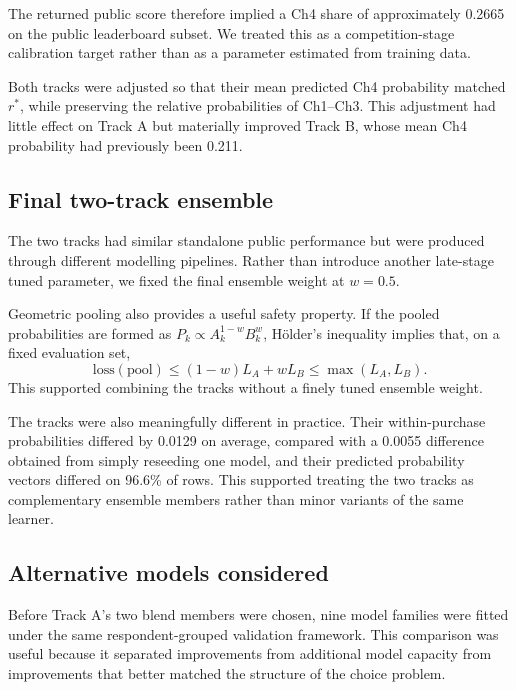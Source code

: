 \documentclass[11pt]{article}
\begin{document}
The returned public score therefore implied a Ch4 share of approximately 0.2665 on the
public leaderboard subset. We treated this as a competition-stage calibration target
rather than as a parameter estimated from training data.

Both tracks were adjusted so that their mean predicted Ch4 probability matched
$r^{*}$, while preserving the relative probabilities of Ch1--Ch3. This adjustment had
little effect on Track A but materially improved Track B, whose mean Ch4 probability had
previously been 0.211.

\subsection{Final two-track ensemble}\label{sub:pool}

The two tracks had similar standalone public performance but were produced through
different modelling pipelines. Rather than introduce another late-stage tuned parameter,
we fixed the final ensemble weight at $w=0.5$.

Geometric pooling also provides a useful safety property. If the pooled probabilities are
formed as $P_k \propto A_k^{1-w}B_k^w$, H\"older's inequality implies that, on a fixed
evaluation set,
\[
\mathrm{loss(pool)} \le (1-w)L_A+wL_B \le \max(L_A,L_B).
\]
This supported combining the tracks without a finely tuned ensemble weight.

The tracks were also meaningfully different in practice. Their within-purchase
probabilities differed by 0.0129 on average, compared with a 0.0055 difference obtained
from simply reseeding one model, and their predicted probability vectors differed on
96.6\% of rows. This supported treating the two tracks as complementary ensemble members
rather than minor variants of the same learner.

\subsection{Alternative models considered}\label{sub:field}

Before Track A's two blend members were chosen, nine model families were fitted under the
same respondent-grouped validation framework. This comparison was useful because it
separated improvements from additional model capacity from improvements that better
matched the structure of the choice problem.
\end{document}

